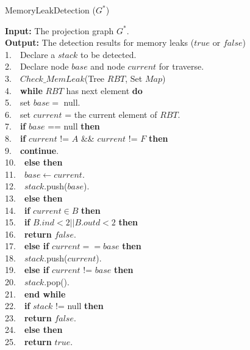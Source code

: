 \begin{algorithm}
\caption{MemoryLeakDetection ($G^*$)}\label{alg:mld}
\textbf{Input:} The projection graph $G^*$.\\
\textbf{Output:} The detection results for memory leaks ($\mathit{true}$ or $\mathit{false}$)\\
1.\ \	Declare a $\mathit{stack}$ to be detected.\\
2.\ \ 	Declare node $\mathit{base}$ and node $\mathit{current}$ for traverse.\\
3.\ \        $\mathit{Check\_MemLeak}$(Tree $\mathit{RBT}$, Set $\mathit{Map}$)\\
4.\ \ 	\textbf{while} $\mathit{RBT}$ has next element \textbf{do} \\
5.\ \ \quad	   set $\mathit{base} =$ null.\\
6.\ \ \quad	   set $\mathit{current}$ = the current element of $\mathit{RBT}$.\\
7.\ \ \quad	    \textbf{if} $\mathit{base}$ == null \textbf{then}\\
8.\ \ \quad \quad	        \textbf{if} $\mathit{current}$ != $A$ \&\& $\mathit{current}$ != $F$ \textbf{then}\\
9.\ \ \quad \quad \quad	            \textbf{continue}.\\
10.\ \ \quad\quad	        \textbf{else then}\\
11.\ \ \quad\quad \quad	            $\mathit{base} \leftarrow \mathit{current}$.\\
12.\ \ \quad\quad \quad	            $\mathit{stack}$.push($\mathit{base}$).\\
13.\ \ \quad	    \textbf{else then}\\
14.\ \ \quad \quad       \textbf{if} $\mathit{current}\in B$ \textbf{then}\\
15.\ \ \quad \quad \quad            \textbf{if} $B.ind<2 || B.outd<2$ \textbf{then}\\
16.\ \ \quad \quad \quad \quad	                \textbf{return} $\mathit{false}$.\\
17.\ \ \quad \quad \quad        \textbf{else if} $\mathit{current} == \mathit{base}$ \textbf{then}\\
18.\ \ \quad \quad \quad \quad	            $\mathit{stack}$.push($\mathit{current}$).\\
19.\ \ \quad \quad \quad	        \textbf{else if} $\mathit{current}$ != $\mathit{base}$ \textbf{then}\\
20.\ \ \quad \quad \quad \quad	            $\mathit{stack}$.pop().\\
21.\ \ 	\textbf{end while}\\
22.\ \ 	\textbf{if} $\mathit{stack}$ != null \textbf{then}\\
23.\ \ \quad    \textbf{return} $\mathit{false}$.\\
24.\ \ 	\textbf{else then}\\
25.\ \ \quad	    \textbf{return} $\mathit{true}$.\\
\end{algorithm}


